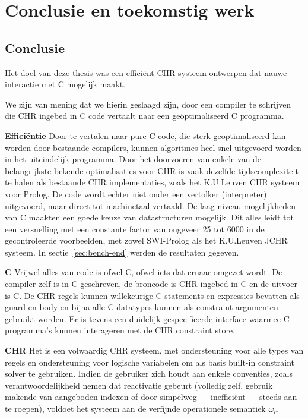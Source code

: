 \chapter{Conclusie en toekomstig werk} \label{chap:concl}

\section{Conclusie} \label{sec:concl}

Het doel van deze thesis was een effici\"ent CHR systeem ontwerpen dat nauwe interactie met C mogelijk maakt.

We zijn van mening dat we hierin geslaagd zijn, door een compiler te schrijven die CHR ingebed in C code vertaalt naar een ge\"optimaliseerd C programma.

{\bf Effici\"entie} Door te vertalen naar pure C code, die sterk geoptimaliseerd kan worden door bestaande compilers, kunnen algoritmes heel snel uitgevoerd worden in het uiteindelijk programma. Door het doorvoeren van enkele van de belangrijkste bekende optimalisaties voor CHR is vaak dezelfde tijdscomplexiteit te halen als bestaande CHR implementaties, zoals het K.U.Leuven CHR systeem voor Prolog. De code wordt echter niet onder een vertolker (interpreter) uitgevoerd, maar direct tot machinetaal vertaald. De laag-niveau mogelijkheden van C maakten een goede keuze van datastructuren mogelijk. Dit alles leidt tot een versnelling met een constante factor van ongeveer 25 tot 6000 in de gecontroleerde voorbeelden, met zowel SWI-Prolog als het K.U.Leuven JCHR systeem. In sectie~\ref{sec:bench-end} werden de resultaten gegeven.

{\bf C} Vrijwel alles van code is ofwel C, ofwel iets dat ernaar omgezet wordt. De compiler zelf is in C geschreven, de broncode is CHR ingebed in C en de uitvoer is C. De CHR regels kunnen willekeurige C statements en expressies bevatten als guard en body en bijna alle C datatypes kunnen als constraint argumenten gebruikt worden. Er is tevens een duidelijk gespecifieerde interface waarmee C programma's kunnen interageren met de CHR constraint store.

{\bf CHR} Het is een volwaardig CHR systeem, met ondersteuning voor alle types van regels en ondersteuning voor logische variabelen om als basis built-in constraint solver te gebruiken. Indien de gebruiker zich houdt aan enkele conventies, zoals verantwoordelijkheid nemen dat reactivatie gebeurt (volledig zelf, gebruik makende van aangeboden indexen of door simpelweg --- ineffici\"ent --- steeds  aan te roepen), voldoet het systeem aan de verfijnde operationele semantiek $\omega_r$.

